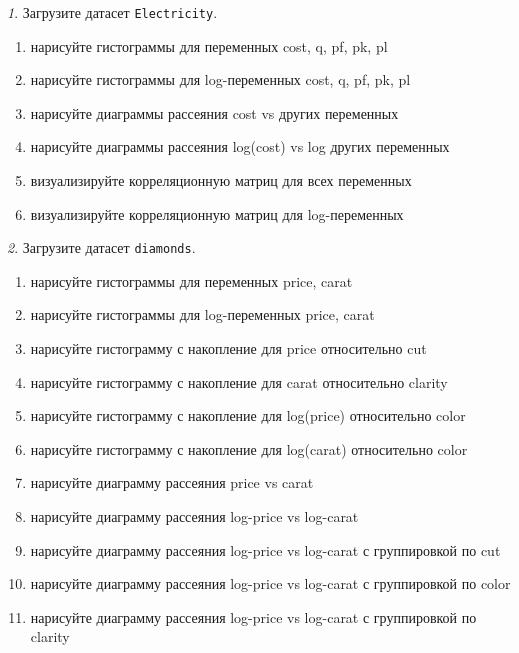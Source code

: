 \documentclass[12pt]{article}
\theoremstyle{remark}
\newtheorem{exercise}{}[section]
\begin{document}
\begin{exercise}
Загрузите датасет \texttt{Electricity}.
\begin{enumerate}
	\item нарисуйте гистограммы для переменных cost, q, pf, pk, pl
	\item нарисуйте гистограммы для log-переменных cost, q, pf, pk, pl
	\item нарисуйте диаграммы рассеяния cost vs других переменных
	\item нарисуйте диаграммы рассеяния log(cost) vs log других переменных
	\item визуализируйте корреляционную матриц для всех переменных
	\item визуализируйте корреляционную матриц для log-переменных
\end{enumerate}
\end{exercise}

\begin{exercise}
Загрузите датасет \texttt{diamonds}.
\begin{enumerate}
	\item нарисуйте гистограммы для переменных price, carat
	\item нарисуйте гистограммы для log-переменных price, carat
	\item нарисуйте гистограмму с накопление для price относительно cut
	\item нарисуйте гистограмму с накопление для carat относительно clarity 
	\item нарисуйте гистограмму с накопление для log(price) относительно color
	\item нарисуйте гистограмму с накопление для log(carat) относительно color
	\item нарисуйте диаграмму рассеяния price vs carat
	\item нарисуйте диаграмму рассеяния log-price vs log-carat
	\item нарисуйте диаграмму рассеяния log-price vs log-carat с группировкой по cut
	\item нарисуйте диаграмму рассеяния log-price vs log-carat с группировкой по color
	\item нарисуйте диаграмму рассеяния log-price vs log-carat с группировкой по clarity
\end{enumerate}
\end{exercise}
\end{document}
